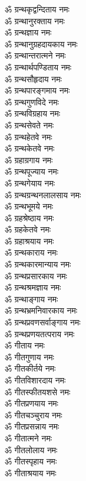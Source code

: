 \begin{multicols}{2}
\begin{flushleft}
ॐ ग्रन्थकृद्वन्दिताय नमः\\
ॐ ग्रन्थानुरक्ताय नमः\\
ॐ ग्रन्थज्ञाय नमः\\
ॐ ग्रन्थानुग्रहदायकाय नमः\\
ॐ ग्रन्थान्तरात्मने नमः\\
ॐ ग्रन्थार्थपण्डिताय नमः\\
ॐ ग्रन्थसौहृदाय नमः\\
ॐ ग्रन्थपारङ्गमाय नमः\hfill{}\\
ॐ ग्रन्थगुणविदे नमः\\
ॐ ग्रन्थविग्रहाय नमः\\
ॐ ग्रन्थसेवते नमः\\
ॐ ग्रन्थहेतवे नमः\\
ॐ ग्रन्थकेतवे नमः\\
ॐ ग्रहाग्रगाय नमः\\
ॐ ग्रन्थपूज्याय नमः\\
ॐ ग्रन्थगेयाय नमः\\
ॐ ग्रन्थग्रन्थनलालसाय नमः\\
ॐ ग्रन्थभूमये नमः\hfill{}\\
ॐ ग्रहश्रेष्ठाय नमः\\
ॐ ग्रहकेतवे नमः\\
ॐ ग्रहाश्रयाय नमः\\
ॐ ग्रन्थकाराय नमः\\
ॐ ग्रन्थकारमान्याय नमः\\
ॐ ग्रन्थप्रसारकाय नमः\\
ॐ ग्रन्थश्रमज्ञाय नमः\\
ॐ ग्रन्थाङ्गाय नमः\\
ॐ ग्रन्थभ्रमनिवारकाय नमः\\
ॐ ग्रन्थप्रवणसर्वाङ्गाय नमः\hfill{}\\
ॐ ग्रन्थप्रणयतत्पराय नमः\\
ॐ गीताय नमः\\
ॐ गीतगुणाय नमः\\
ॐ गीतकीर्तये नमः\\
ॐ गीतविशारदाय नमः\\
ॐ गीतस्फीतयशसे नमः\\
ॐ गीतप्रणयाय नमः\\
ॐ गीतचञ्चुराय नमः\\
ॐ गीतप्रसन्नाय नमः\\
ॐ गीतात्मने नमः\hfill{}\\
ॐ गीतलोलाय नमः\\
ॐ गीतस्पृहाय नमः\\
ॐ गीताश्रयाय नमः\\

\end{flushleft}
\end{multicols}

